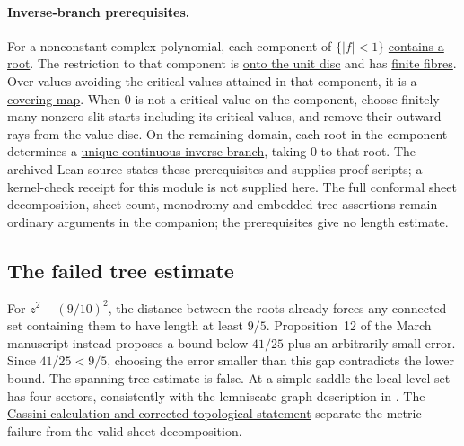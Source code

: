 \documentclass[11pt]{article}
\newcommand{\recordlink}[3]{\href{#1\##2}{#3}}
\begin{document}
\paragraph{Inverse-branch prerequisites.}
\label{res:component-local-covering}
For a nonconstant complex polynomial, each component of $\{|f|<1\}$
\href{https://github.com/wcook04/plectis-erdos/blob/e98130bfe66aa33606e116791080b3ed13e1d68a/evidence/source-prerequisites/8bf96bdcae6b9201c670fff3037c49c70ec6de8d/lean/ErdosProblems/Erdos1041/OutwardSlitDomain.lean\#L349}{contains a root}.
The restriction to that component is
\href{https://github.com/wcook04/plectis-erdos/blob/e98130bfe66aa33606e116791080b3ed13e1d68a/evidence/source-prerequisites/8bf96bdcae6b9201c670fff3037c49c70ec6de8d/lean/ErdosProblems/Erdos1041/OutwardSlitDomain.lean\#L211}{onto the unit disc} and has
\href{https://github.com/wcook04/plectis-erdos/blob/e98130bfe66aa33606e116791080b3ed13e1d68a/evidence/source-prerequisites/8bf96bdcae6b9201c670fff3037c49c70ec6de8d/lean/ErdosProblems/Erdos1041/OutwardSlitDomain.lean\#L233}{finite fibres}.
Over values avoiding the critical values attained in that component,
it is a \href{https://github.com/wcook04/plectis-erdos/blob/e98130bfe66aa33606e116791080b3ed13e1d68a/evidence/source-prerequisites/8bf96bdcae6b9201c670fff3037c49c70ec6de8d/lean/ErdosProblems/Erdos1041/OutwardSlitDomain.lean\#L250}{covering map}.
When $0$ is not a critical value on the component, choose finitely many
nonzero slit starts including its critical values, and remove their
outward rays from the value disc. On the remaining domain, each root
in the component determines a
\href{https://github.com/wcook04/plectis-erdos/blob/e98130bfe66aa33606e116791080b3ed13e1d68a/evidence/source-prerequisites/8bf96bdcae6b9201c670fff3037c49c70ec6de8d/lean/ErdosProblems/Erdos1041/OutwardSlitDomain.lean\#L359}{unique continuous inverse branch}, taking $0$ to that root.
The archived Lean source states these prerequisites and supplies proof
scripts; a kernel-check receipt for this module is not supplied here.
The full conformal
sheet decomposition, sheet count, monodromy and embedded-tree assertions
remain ordinary arguments in the companion; the prerequisites give no
length estimate.

\subsection{The failed tree estimate}\label{sec:gap}\label{sec:finite}
For $z^2-(9/10)^2$, the distance between the roots already forces any
connected set containing them to have length at least $9/5$.
Proposition~12 of the March manuscript \cite{march2026} instead proposes
a bound below $41/25$ plus an arbitrarily small error. Since
$41/25<9/5$, choosing the error smaller than this gap contradicts the
lower bound. The spanning-tree estimate is false. At a simple saddle
the local level set has four sectors, consistently with the lemniscate
graph description in \cite[Definition~1.2 and Proposition~2.4]{bishop-eremenko-lazebnik}. The
\recordlink{erdos1041-lemniscate-reasoning-surface.pdf}{cassini-counterexample}
{Cassini calculation and corrected topological statement} separate the
metric failure from the valid sheet decomposition.
\end{document}
